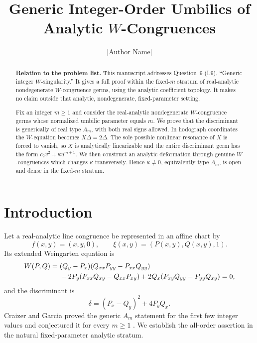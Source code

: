 \documentclass[11pt]{article}
\title{Generic Integer-Order Umbilics of Analytic $W$-Congruences}
\author{[Author Name]}
\date{}
\theoremstyle{remark}
\begin{document}
\maketitle

\begin{abstract}
\textbf{Relation to the problem list.}
This manuscript addresses Question~9 (L9), ``Generic integer
$W$-singularity.''  It gives a full proof within the fixed-$m$ stratum of
real-analytic nondegenerate $W$-congruence germs, using the analytic
coefficient topology.  It makes no claim outside that analytic,
nondegenerate, fixed-parameter setting.

Fix an integer $m\ge1$ and consider the real-analytic nondegenerate
$W$-congruence germs whose normalized umbilic parameter equals $m$.  We
prove that the discriminant is generically of real type $A_m$, with both
real signs allowed.  In hodograph coordinates the $W$-equation becomes
$X\Delta=2\Delta$.  The sole possible nonlinear resonance of $X$ is forced
to vanish, so $X$ is analytically linearizable and the entire discriminant
germ has the form $c_2v^2+\kappa u^{m+1}$.  We then construct an analytic
deformation through genuine $W$-congruences which changes $\kappa$
transversely.  Hence $\kappa\ne0$, equivalently type $A_m$, is open and
dense in the fixed-$m$ stratum.
\end{abstract}

\section{Introduction}

Let a real-analytic line congruence be represented in an affine chart by
\[
 f(x,y)=(x,y,0),
 \qquad
 \xi(x,y)=(P(x,y),Q(x,y),1).
\]
Its extended Weingarten equation is
\begin{align}
 W(P,Q)={}&(Q_y-P_x)(Q_{xx}P_{yy}-P_{xx}Q_{yy})\notag\\
 &-2P_y(P_{xx}Q_{xy}-Q_{xx}P_{xy})
 +2Q_x(P_{xy}Q_{yy}-P_{yy}Q_{xy})=0,\label{eq:W}
\end{align}
and the discriminant is
\begin{equation}\label{eq:delta}
 \delta=(P_x-Q_y)^2+4P_yQ_x.
\end{equation}
Craizer and Garcia proved the generic $A_m$ statement for the first few
integer values and conjectured it for every $m\ge1$ \cite{CraizerGarcia}.
We establish the all-order assertion in the natural fixed-parameter
analytic stratum.
\end{document}
